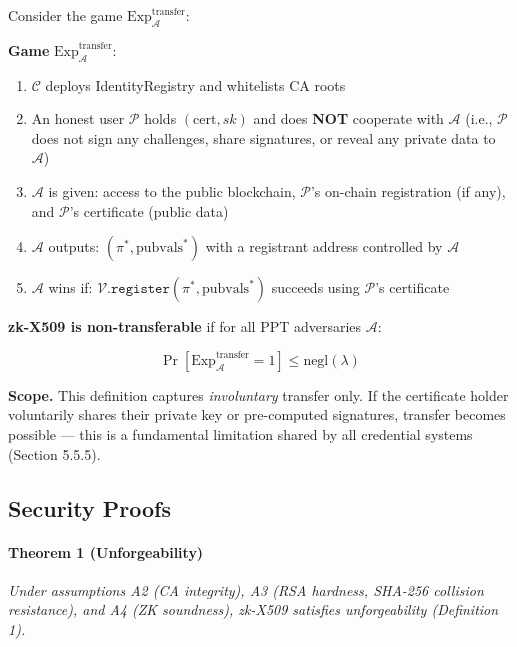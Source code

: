 \documentclass[11pt, a4paper]{article}
\begin{document}
Consider the game \(\text{Exp}_{\mathcal{A}}^{\text{transfer}}\):

\begin{mdframed}[linewidth=0.5pt, innertopmargin=6pt, innerbottommargin=6pt]
\small
\textbf{Game} $\text{Exp}_{\mathcal{A}}^{\text{transfer}}$:
\begin{enumerate}[nosep,leftmargin=1.5em]
\item $\mathcal{C}$ deploys IdentityRegistry and whitelists CA roots
\item An honest user $\mathcal{P}$ holds $(\text{cert}, sk)$ and does \textbf{NOT} cooperate with $\mathcal{A}$ (i.e., $\mathcal{P}$ does not sign any challenges, share signatures, or reveal any private data to $\mathcal{A}$)
\item $\mathcal{A}$ is given: access to the public blockchain, $\mathcal{P}$'s on-chain registration (if any), and $\mathcal{P}$'s certificate (public data)
\item $\mathcal{A}$ outputs: $(\pi^*, \text{pubvals}^*)$ with a registrant address controlled by $\mathcal{A}$
\item $\mathcal{A}$ wins if: $\mathcal{V}.\texttt{register}(\pi^*, \text{pubvals}^*)$ succeeds using $\mathcal{P}$'s certificate
\end{enumerate}
\end{mdframed}

\textbf{zk-X509 is non-transferable} if for all PPT adversaries
\(\mathcal{A}\):

\[\Pr[\text{Exp}_{\mathcal{A}}^{\text{transfer}} = 1] \leq \text{negl}(\lambda)\]

\textbf{Scope.} This definition captures \emph{involuntary} transfer
only. If the certificate holder voluntarily shares their private key or
pre-computed signatures, transfer becomes possible --- this is a
fundamental limitation shared by all credential systems (Section 5.5.5).

\subsection{Security Proofs}\label{security-proofs}

\paragraph{Theorem 1 (Unforgeability)}\label{theorem-1-unforgeability}

\emph{Under assumptions A2 (CA integrity), A3 (RSA hardness, SHA-256
collision resistance), and A4 (ZK soundness), zk-X509 satisfies
unforgeability (Definition 1).}
\end{document}
